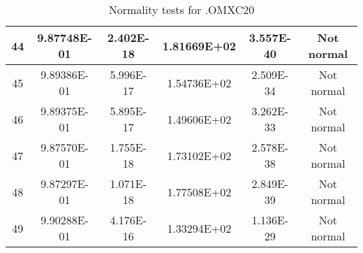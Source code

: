 \begin{table}[h]
\begin{tabular}{|c|c|c|c|c|c|}
		44 & 9.87748E-01 & 2.402E-18 & 1.81669E+02 & 3.557E-40 & Not normal\\\hline
		45 & 9.89386E-01 & 5.996E-17 & 1.54736E+02 & 2.509E-34 & Not normal\\\hline
		46 & 9.89375E-01 & 5.895E-17 & 1.49606E+02 & 3.262E-33 & Not normal\\\hline
		47 & 9.87570E-01 & 1.755E-18 & 1.73102E+02 & 2.578E-38 & Not normal\\\hline
		48 & 9.87297E-01 & 1.071E-18 & 1.77508E+02 & 2.849E-39 & Not normal\\\hline
		49 & 9.90288E-01 & 4.176E-16 & 1.33294E+02 & 1.136E-29 & Not normal\\\hline
	\end{tabular}
	\caption{Normality tests for .OMXC20}
	\label{tab:normality_tests_OMXC20}
\end{table}
